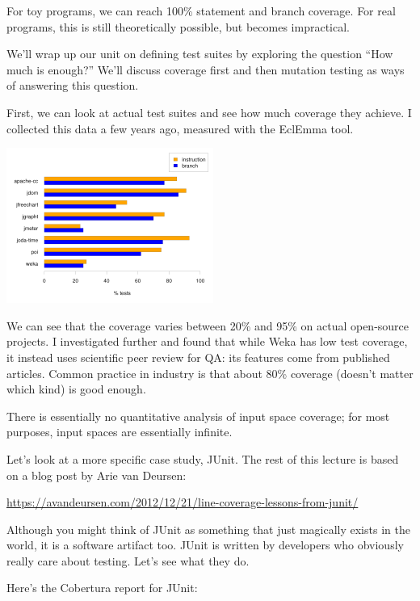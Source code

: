 \documentclass[11pt]{article}
\begin{document}
For toy programs, we can reach 100\% statement and branch coverage.
For real programs, this is still theoretically possible, but becomes
impractical. 

We'll wrap up our unit on defining test suites by exploring the question
``How much is enough?'' We'll discuss coverage first and then mutation testing
as ways of answering this question.

First, we can look at actual test suites and see how much coverage they achieve.
I collected this data a few years ago, measured with the EclEmma tool.

\begin{center}
  \includegraphics[height=2in]{L03/coverage.png}
\end{center}

We can see that the coverage varies between 20\% and 95\% on actual
open-source projects. I investigated further and found that while Weka has low
test coverage, it instead uses scientific peer review for QA: its features
come from published articles. Common practice in industry is that about 80\%
coverage (doesn't matter which kind) is good enough.

There is essentially no quantitative analysis of input space coverage;
for most purposes, input spaces are essentially infinite.

\newpage
Let's look at a more specific case study, JUnit. The rest of this lecture is
based on a blog post by Arie van Deursen:

\begin{center}
  \url{https://avandeursen.com/2012/12/21/line-coverage-lessons-from-junit/}
\end{center}

Although you might think of JUnit as something that just magically exists in the world,
it is a software artifact too. JUnit is written by developers who obviously really care
about testing. Let's see what they do.

Here's the Cobertura report for JUnit:
\end{document}

